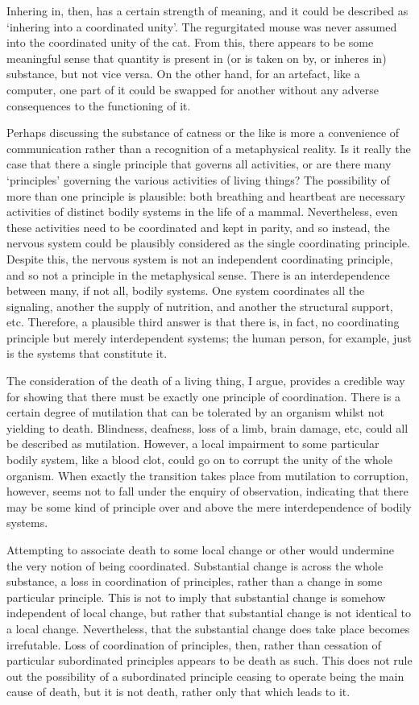 Inhering in, then, has a certain strength of meaning, and it could be described as `inhering into a coordinated unity'. The regurgitated mouse was never assumed into the coordinated unity of the cat. From this, there appears to be some meaningful sense that quantity is present in (or is taken on by, or inheres in) substance, but not vice versa. On the other hand, for an artefact, like a computer, one part of it could be swapped for another without any adverse consequences to the functioning of it.

Perhaps discussing the substance of catness or the like is more a convenience of communication rather than a recognition of a metaphysical reality. Is it really the case that there a single principle that governs all activities, or are there many `principles' governing the various activities of living things?
The possibility of more than one principle is plausible: both breathing and heartbeat are necessary activities of distinct bodily systems in the life of a mammal. Nevertheless, even these activities need to be coordinated and kept in parity, and so instead, the nervous system could be plausibly considered as the single coordinating principle. Despite this, the nervous system is not an independent coordinating principle, and so not a principle in the metaphysical sense. There is an interdependence between many, if not all, bodily systems. One system coordinates all the signaling, another the supply of nutrition, and another the structural support, etc. Therefore, a plausible third answer is that there is, in fact, no coordinating principle but merely interdependent systems; the human person, for example, just is the systems that constitute it.

The consideration of the death of a living thing, I argue, provides a credible way for showing that there must be exactly one principle of coordination. There is a certain degree of mutilation that can be tolerated by an organism whilst not yielding to death. Blindness, deafness, loss of a limb, brain damage, etc, could all be described as mutilation. However, a local impairment to some particular bodily system, like a blood clot, could go on to corrupt the unity of the whole organism. When exactly the transition takes place from mutilation to corruption, however, seems not to fall under the enquiry of observation, indicating that there may be some kind of principle over and above the mere interdependence of bodily systems.

Attempting to associate death to some local change or other would undermine the very notion of being coordinated. Substantial change is across the whole substance, a loss in coordination of principles, rather than a change in some particular principle. This is not to imply that substantial change is somehow independent of local change, but rather that substantial change is not identical to a local change. Nevertheless, that the substantial change does take place becomes irrefutable. Loss of coordination of principles, then, rather than cessation of particular subordinated principles appears to be death as such. This does not rule out the possibility of a subordinated principle ceasing to operate being the main cause of death, but it is not death, rather only that which leads to it.

